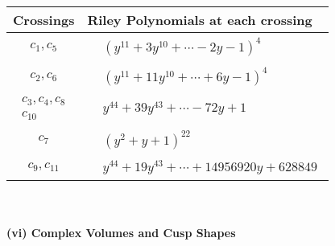 \documentclass[1p]{elsarticle_modified}
\theoremstyle{definition}
\begin{document}
\begin{tabular}{m{50pt}|m{274pt}}
Crossings & \hspace{64pt}Riley Polynomials at each crossing \\
\hline $$\begin{aligned}c_{1},c_{5}\end{aligned}$$&$\begin{aligned}
&(y^{11}+3 y^{10}+\cdots-2 y-1)^{4}
\end{aligned}$\\
\hline $$\begin{aligned}c_{2},c_{6}\end{aligned}$$&$\begin{aligned}
&(y^{11}+11 y^{10}+\cdots+6 y-1)^{4}
\end{aligned}$\\
\hline $$\begin{aligned}c_{3},c_{4},c_{8}\\c_{10}\end{aligned}$$&$\begin{aligned}
&y^{44}+39 y^{43}+\cdots-72 y+1
\end{aligned}$\\
\hline $$\begin{aligned}c_{7}\end{aligned}$$&$\begin{aligned}
&(y^2+y+1)^{22}
\end{aligned}$\\
\hline $$\begin{aligned}c_{9},c_{11}\end{aligned}$$&$\begin{aligned}
&y^{44}+19 y^{43}+\cdots+14956920 y+628849
\end{aligned}$\\
\hline
\end{tabular}\\~\\
\newpage\flushleft \textbf{(vi) Complex Volumes and Cusp Shapes}
\end{document}

